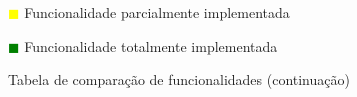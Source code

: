 \begin{table}[!ht]
\hspace{1.2cm}     \textcolor{yellow}{$\blacksquare$} Funcionalidade parcialmente implementada

\hspace{1.2cm}     \textcolor{green}{$\blacksquare$} Funcionalidade totalmente implementada 
\begin{center}
\caption{Tabela de comparação de funcionalidades (continuação)}
\label{tab:comparacao3}
\end{center}
\end{table}

\pagebreak
\blankpage

\glsresetall



